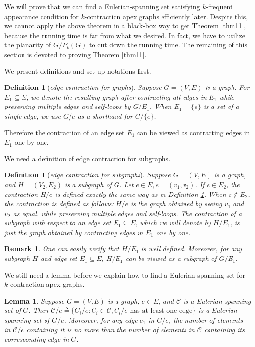 \documentclass[10pt,fleqn]{article}
\newtheorem{lemma}[theorem]{Lemma}
\newtheorem{definition}[theorem]{Definition}
\newtheorem{remark}[theorem]{Remark}
\newcommand{\mc}[1]{\mathcal{#1}}
\begin{document}
	We will prove that we can find a Eulerian-spanning set satisfying $k$-frequent appearance condition for $k$-contraction apex graphs efficiently later. Despite this, we cannot apply the above theorem in a black-box way to get Theorem \ref{thm11}, because the running time is far from what we desired. In fact, we have to utilize the planarity of $G/P_k(G)$ to cut down the running time. The remaining of this section is devoted to proving Theorem \ref{thm11}. \par
	We present definitions and set up notations first. \par
	\begin{definition}[\it{edge contraction for graphs}]\label{def51}
		Suppose $G=(V,E)$ is a graph. For $E_1\subseteq E$, we denote the resulting graph after contracting all edges in $E_1$ while preserving multiple edges and self-loops by $G/ E_1$. When $E_1=\{e\}$ is a set of a single edge, we use $G/e$ as a shorthand for $G/\{e\}$.
	\end{definition}
	Therefore the contraction of an edge set $E_1$ can be viewed as contracting edges in $E_1$ one by one. \par
	We need a definition of edge contraction for subgraphs.
	\begin{definition}[\it{edge contraction for subgraphs}]
		Suppose $G=(V,E)$ is a graph, and $H=(V_2,E_2)$ is a subgraph of $G$. Let $e\in E,e=(v_1,v_2)$. If $e\in E_2$, the contraction $H/e$ is defined exactly the same way as in Definition \ref{def51}. When $e\notin E_2$, the contraction is defined as follows: $H/e$ is the graph obtained by seeing $v_1$ and $v_2$ as equal, while preserving multiple edges and self-loops. The contraction of a subgraph with respect to an edge set $E_1\subseteq E$, which we will denote by $H/E_1$, is just the graph obtained by contracting edges in $E_1$ one by one.
	\end{definition}
	\begin{remark}
		One can easily verify that $H/E_1$ is well defined. Moreover, for any subgraph $H$ and edge set $E_1\subseteq E$, $H/E_1$ can be viewed as a subgraph of $G/E_1$.
	\end{remark} \par
	We still need a lemma before we explain how to find a Eulerian-spanning set for $k$-contraction apex graphs.
	\begin{lemma}\label{lem61}
		Suppose $G=(V,E)$ is a graph, $e\in E$, and $\mc{C}$ is a Eulerian-spanning set of $G$. Then $\mc{C}/e\triangleq\{C_i/e: C_i\in\mc{C},C_i/e\text{ has at least one edge}\}$ is a Eulerian-spanning set of $G/ e$. Moreover, for any edge $e_1$ in $G/ e$, the number of elements in $\mc{C}/ e$ containing it is no more than the number of elements in $\mc{C}$ containing its corresponding edge in $G$.
	\end{lemma}
\end{document}
